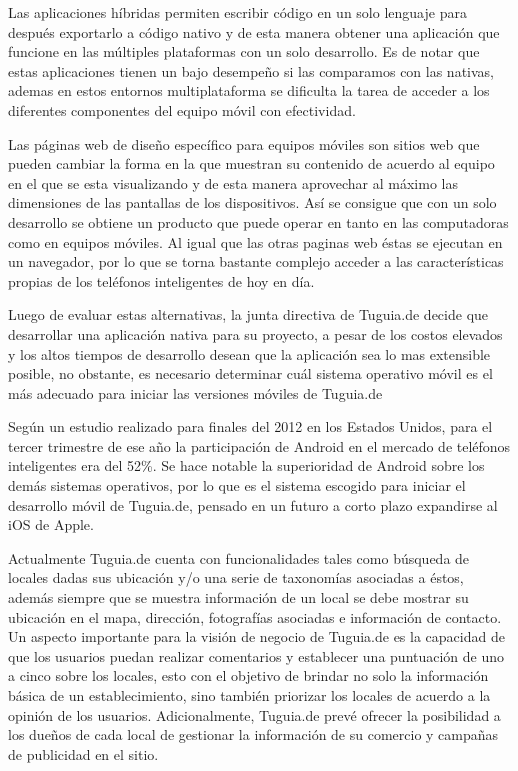 Las aplicaciones híbridas permiten escribir código en un solo lenguaje para después exportarlo a código nativo y de esta manera obtener una aplicación que funcione en las múltiples plataformas con un solo desarrollo. Es de notar que estas aplicaciones tienen un bajo desempeño si las comparamos con las nativas, ademas en estos entornos multiplataforma se dificulta la tarea de acceder a los diferentes componentes del equipo móvil con efectividad. 

Las páginas web de diseño específico para equipos móviles son sitios web que pueden cambiar la forma en la que muestran su contenido de acuerdo al equipo en el que se esta visualizando y de esta manera aprovechar al máximo las dimensiones de las pantallas de los dispositivos. Así se consigue que con un solo desarrollo se obtiene un producto que puede operar en tanto en las computadoras como en equipos móviles. Al igual que las otras paginas web éstas se ejecutan en un navegador, por lo que se torna bastante complejo acceder a las características propias de los teléfonos inteligentes de hoy en día. 

Luego de evaluar estas alternativas, la junta directiva de Tuguia.de decide que desarrollar una aplicación nativa para su proyecto, a pesar de los costos elevados y los altos tiempos de desarrollo desean que la aplicación sea lo mas extensible posible, no obstante, es necesario determinar cuál sistema operativo móvil es el más adecuado para iniciar las versiones móviles de Tuguia.de

Según un estudio realizado para finales del 2012 en los Estados Unidos,\cite{NTD} para el tercer trimestre de ese año la participación de Android en el mercado de teléfonos inteligentes era del 52\%. Se hace notable la superioridad de Android sobre los demás sistemas operativos, por lo que es el sistema escogido para iniciar el desarrollo móvil de Tuguia.de, pensado en un futuro a corto plazo expandirse al iOS de Apple.

Actualmente Tuguia.de cuenta con funcionalidades tales como búsqueda de locales dadas sus ubicación y/o una serie de taxonomías asociadas a éstos, además siempre que se muestra información de un local se debe mostrar su ubicación en el mapa, dirección, fotografías asociadas e información de contacto. Un aspecto importante para la visión de negocio de Tuguia.de es la capacidad de que los usuarios puedan realizar comentarios y establecer una puntuación de uno a cinco  sobre los locales, esto con el objetivo de brindar no solo la información básica de un establecimiento, sino también priorizar los locales de acuerdo a la opinión de los usuarios. Adicionalmente, Tuguia.de prevé ofrecer la posibilidad a los dueños de cada local de gestionar la información de su comercio y campañas de publicidad en el sitio.

